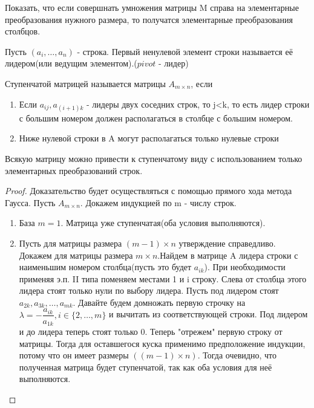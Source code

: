 \begin{exercise}
	Показать, что если совершнать умножения матрицы M справа на элементарные преобразования нужного размера, то получатся элементарные преобразования столбцов.
\end{exercise}
\begin{definition}
	Пусть \((a_i, \ldots, a_n)\) - строка. Первый ненулевой элемент строки называется её лидером(или ведущим элементом).(\(pivot\) - лидер)
\end{definition}
\begin{definition}
	Ступенчатой матрицей называется матрицы \(A_{m\times n}\), если 
	\begin{enumerate}
		\item Если \(a_{ij}, a_{(i+1)k}\) - лидеры двух соседних строк, то j<k, то есть лидер строки с большим номером должен располагаться в столбце с большим номером.
		\item Ниже нулевой строки в A могут располагаться только нулевые строки
		
	\end{enumerate}
\end{definition}
\begin{theorem}
	Всякую матрицу можно привести к ступенчатому виду с использованием только элементарных преобразований строк.
\end{theorem}
\begin{proof}
	Доказательство будет осуществляться с помощью прямого хода метода Гаусса. Пусть \(A_{m\times n}\). Докажем индукцией по m - числу строк.
	\begin{enumerate}
		\item База  \(m = 1\). Матрица уже ступенчатая(оба условия выполняются).
		\item Пусть для матрицы размера \((m-1)\times n\) утверждение справедливо. Докажем для матрицы размера \(m\times n\).Найдем в матрице A лидера строки с наименьшим номером столбца(пусть это будет \(a_{ik}\)). При необходимости применяя э.п. II типа поменяем местами 1 и i строку. Слева от столбца этого лидера стоят только нули по выбору лидера. Пусть под лидером стоят \(a_{2k}, a_{3k}, \ldots, a_{mk}\). Давайте будем домножать первую строчку на \(\lambda = -\dfrac{a_{ik}}{a_{1k}}, i \in \{2, \ldots, m\}\) и вычитать из соответствующей строки. Под лидером и до лидера теперь стоят только 0. Теперь "отрежем" первую строку от матрицы. Тогда для оставшегося куска применимо предположение индукции, потому что он имеет размеры \(((m-1)\times n)\). Тогда очевидно, что полученная матрица будет ступенчатой, так как оба условия для неё выполняются.
	\end{enumerate}
\end{proof}
